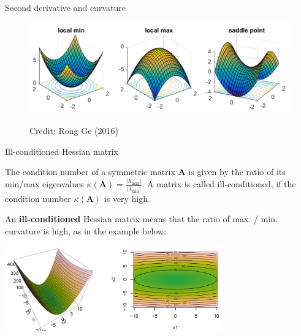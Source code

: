 \begin{vbframe}{Second derivative and curvature}
\begin{figure}
 \begin{center}
  \includegraphics[width=.7\textwidth]{plots/3dim_curvature.png}
 \end{center}
 \tiny{Credit: Rong Ge (2016)}
 \end{figure}

 \end{vbframe}

 \begin{vbframe}{Ill-conditioned Hessian matrix} 


 The condition number of a symmetric matrix $\bm{A}$ is given by the ratio of its min/max eigenvalues $\kappa(\bm{A}) = \frac{|\lambda_{\text{max}}|}{|\lambda_{\text{min}}|}$. A matrix is called ill-conditioned, if the condition number $\kappa(\bm{A})$ is very high. 

 \lz 

 An \textbf{ill-conditioned} Hessian matrix means that the ratio of max. / min. curvature is high, as in the example below: 

\begin{center}
  \includegraphics[width=0.7\textwidth]{plots/ill-con.png}
\end{center}


\end{vbframe}

